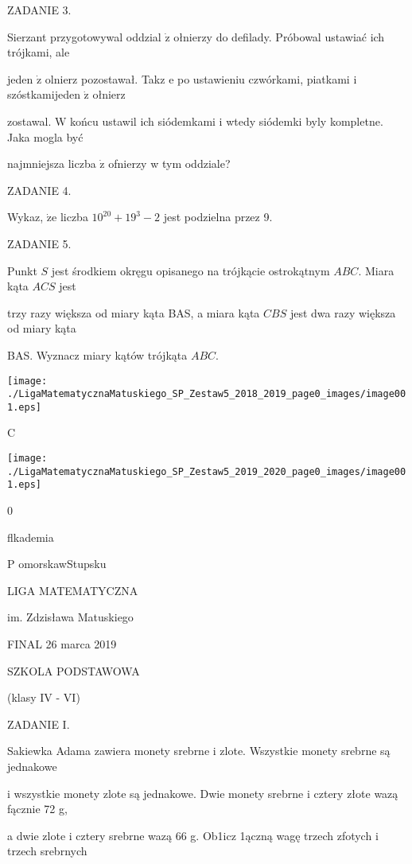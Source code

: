\documentclass[a4paper,12pt]{article}
\begin{document}
ZADANIE 3.

Sierzant przygotowywal oddzial $\dot{\mathrm{z}}$ ołnierzy do defilady. Próbowal ustawiać ich trójkami, ale

jeden $\dot{\mathrm{z}}$ olnierz pozostawał. Takz $\mathrm{e}$ po ustawieniu czwórkami, piatkami i szóstkamijeden $\dot{\mathrm{z}}$ ołnierz

zostawal. $\mathrm{W}$ końcu ustawil ich siódemkami i wtedy siódemki byly kompletne. Jaka mogla być

najmniejsza liczba $\dot{\mathrm{z}}$ ofnierzy w tym oddziale?

ZADANIE 4.

Wykaz, $\dot{\mathrm{z}}\mathrm{e}$ liczba $10^{20}+19^{3}-2$ jest podzielna przez 9.

ZADANIE 5.

Punkt $S$ jest środkiem okręgu opisanego na trójkącie ostrokątnym $ABC$. Miara kąta $ACS$ jest

trzy razy większa od miary kąta BAS, a miara kąta $CBS$ jest dwa razy większa od miary kąta

BAS. Wyznacz miary kątów trójkąta $ABC.$
\begin{center}
\texttt{[image: ./LigaMatematycznaMatuskiego\_SP\_Zestaw5\_2018\_2019\_page0\_images/image001.eps]}
\end{center}
C





\begin{center}
\texttt{[image: ./LigaMatematycznaMatuskiego\_SP\_Zestaw5\_2019\_2020\_page0\_images/image001.eps]}
\end{center}
0

flkademia

P omorskawStupsku

LIGA MATEMATYCZNA

im. Zdzisława Matuskiego

FINAL 26 marca 2019

SZKOLA PODSTAWOWA

(klasy IV - VI)

ZADANIE I.

Sakiewka Adama zawiera monety srebrne i zlote. Wszystkie monety srebrne są jednakowe

i wszystkie monety zlote są jednakowe. Dwie monety srebrne i cztery złote wazą fącznie 72 g,

a dwie zlote i cztery srebrne wazą 66 g. Ob1icz 1ączną wagę trzech zfotych i trzech srebrnych
\end{document}
